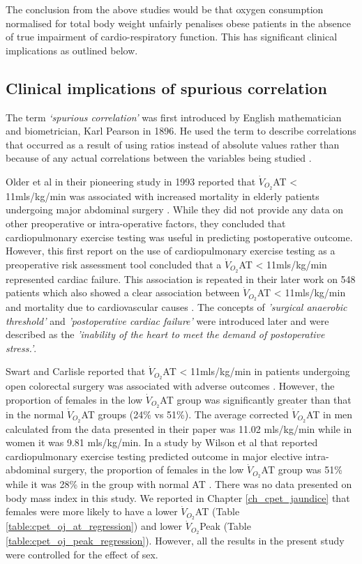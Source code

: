 The conclusion from the above studies would be that oxygen consumption normalised for total body weight unfairly penalises obese patients in the absence of true impairment of cardio-respiratory function. 
This has significant clinical implications as outlined below.

\subsection{Clinical implications of spurious correlation}

The term \textit{`spurious correlation'} was first introduced by English mathematician and biometrician, Karl Pearson in 1896. 
He used the term to describe correlations that occurred as a result of using ratios instead of absolute values rather than because of any actual correlations between the variables being studied \parencite{pearson_mathematical_1896}.

Older et al in their pioneering study in 1993 reported that $\dot{V}_{O_2}$AT < 11mls/kg/min was associated with increased mortality in elderly patients undergoing major abdominal surgery \parencite{older_preoperative_1993}. 
While they did not provide any data on other preoperative or intra-operative factors, they concluded that cardiopulmonary exercise testing was useful in predicting postoperative outcome. 
However, this first report on the use of cardiopulmonary exercise testing as a preoperative risk assessment tool concluded that a $\dot{V}_{O_2}$AT < 11mls/kg/min represented cardiac failure. 
This association is repeated in their later work on 548 patients which also showed a clear association between $\dot{V}_{O_2}$AT < 11mls/kg/min and mortality due to cardiovascular causes \parencite{older_cardiopulmonary_1999}. 
The concepts of \textit{'surgical anaerobic threshold'} and \textit{'postoperative cardiac failure'} were introduced later and were described as the \textit{'inability of the heart to meet the demand of postoperative stress.'}\parencite{society_ats/accp_2003}.

Swart and Carlisle reported that $\dot{V}_{O_2}$AT < 11mls/kg/min in patients undergoing open colorectal surgery was associated with adverse outcomes \parencite{swart_case-controlled_2012}. 
However, the proportion of females in the low $\dot{V}_{O_2}$AT group was significantly greater than that in the normal $\dot{V}_{O_2}$AT groups (24\% vs 51\%). 
The average corrected $\dot{V}_{O_2}$AT in men calculated from the data presented in their paper was 11.02 mls/kg/min while in women it was 9.81 mls/kg/min. 
In a study by Wilson et al that reported cardiopulmonary exercise testing predicted outcome in major elective intra-abdominal surgery, the proportion of females in the low $\dot{V}_{O_2}$AT group was 51\% while it was 28\% in the group with normal AT \parencite{wilson_impaired_2010}. 
There was no data presented on body mass index in this study. 
We reported in Chapter \ref{ch_cpet_jaundice} that females were more likely to have a lower $\dot{V}_{O_2}$AT (Table \ref{table:cpet_oj_at_regression}) and lower $\dot{V}_{O_2}$Peak (Table \ref{table:cpet_oj_peak_regression}). 
However, all the results in the present study were controlled for the effect of sex. 

